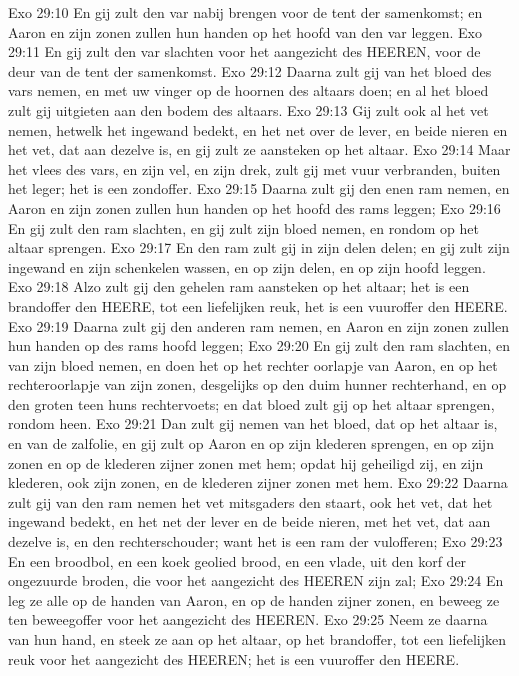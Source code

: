Exo 29:10  En gij zult den var nabij brengen voor de tent der samenkomst; en Aaron en zijn zonen zullen hun handen op het hoofd van den var leggen.
Exo 29:11  En gij zult den var slachten voor het aangezicht des HEEREN, voor de deur van de tent der samenkomst.
Exo 29:12  Daarna zult gij van het bloed des vars nemen, en met uw vinger op de hoornen des altaars doen; en al het bloed zult gij uitgieten aan den bodem des altaars.
Exo 29:13  Gij zult ook al het vet nemen, hetwelk het ingewand bedekt, en het net over de lever, en beide nieren en het vet, dat aan dezelve is, en gij zult ze aansteken op het altaar.
Exo 29:14  Maar het vlees des vars, en zijn vel, en zijn drek, zult gij met vuur verbranden, buiten het leger; het is een zondoffer.
Exo 29:15  Daarna zult gij den enen ram nemen, en Aaron en zijn zonen zullen hun handen op het hoofd des rams leggen;
Exo 29:16  En gij zult den ram slachten, en gij zult zijn bloed nemen, en rondom op het altaar sprengen.
Exo 29:17  En den ram zult gij in zijn delen delen; en gij zult zijn ingewand en zijn schenkelen wassen, en op zijn delen, en op zijn hoofd leggen.
Exo 29:18  Alzo zult gij den gehelen ram aansteken op het altaar; het is een brandoffer den HEERE, tot een liefelijken reuk, het is een vuuroffer den HEERE.
Exo 29:19  Daarna zult gij den anderen ram nemen, en Aaron en zijn zonen zullen hun handen op des rams hoofd leggen;
Exo 29:20  En gij zult den ram slachten, en van zijn bloed nemen, en doen het op het rechter oorlapje van Aaron, en op het rechteroorlapje van zijn zonen, desgelijks op den duim hunner rechterhand, en op den groten teen huns rechtervoets; en dat bloed zult gij op het altaar sprengen, rondom heen.
Exo 29:21  Dan zult gij nemen van het bloed, dat op het altaar is, en van de zalfolie, en gij zult op Aaron en op zijn klederen sprengen, en op zijn zonen en op de klederen zijner zonen met hem; opdat hij geheiligd zij, en zijn klederen, ook zijn zonen, en de klederen zijner zonen met hem.
Exo 29:22  Daarna zult gij van den ram nemen het vet mitsgaders den staart, ook het vet, dat het ingewand bedekt, en het net der lever en de beide nieren, met het vet, dat aan dezelve is, en den rechterschouder; want het is een ram der vulofferen;
Exo 29:23  En een broodbol, en een koek geolied brood, en een vlade, uit den korf der ongezuurde broden, die voor het aangezicht des HEEREN zijn zal;
Exo 29:24  En leg ze alle op de handen van Aaron, en op de handen zijner zonen, en beweeg ze ten beweegoffer voor het aangezicht des HEEREN.
Exo 29:25  Neem ze daarna van hun hand, en steek ze aan op het altaar, op het brandoffer, tot een liefelijken reuk voor het aangezicht des HEEREN; het is een vuuroffer den HEERE.

